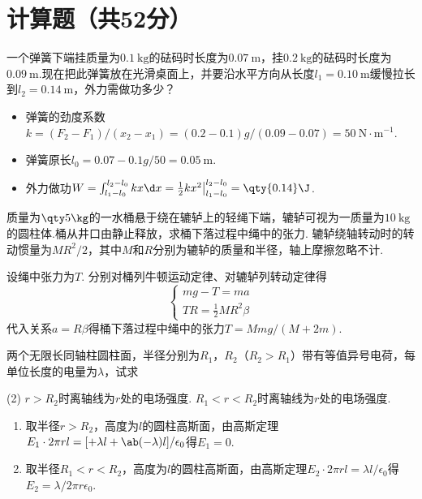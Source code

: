 \clearpage

\section{计算题（共52分）}

\begin{problem}
    一个弹簧下端挂质量为$\qty{0.1}\kg$的砝码时长度为$\qty{0.07}\m$，挂$\qty{0.2}\kg$的砝码时长度为$\qty{0.09}\m$.现在把此弹簧放在光滑桌面上，并要沿水平方向从长度$l_1=\qty{0.10}\m$缓慢拉长到$l_2=\qty{0.14}\m$，外力需做功多少？
\end{problem}
\begin{solution}\leavevmode
    \begin{itemize}
        \item 弹簧的劲度系数$k=(F_2-F_1)/(x_2-x_1)=(0.2-0.1)g/(0.09-0.07)=\qty{50}{\N\cdot\m^{-1}}$.
        \item 弹簧原长$l_0=0.07-0.1g/50=\qty{0.05}\m$.
        \item 外力做功$W=\int_{l_1-l_0}^{l_2-l_0}{kx\d x}=\frac{1}{2}kx^2\big|_{l_1-l_0}^{l_2-l_0}=\qty{0.14}\J$.
    \end{itemize}
\end{solution}

\begin{problem}
    质量为$\qty5\kg$的一水桶悬于绕在辘轳上的轻绳下端，辘轳可视为一质量为$\qty{10}\kg$的圆柱体.桶从井口由静止释放，求桶下落过程中绳中的张力. 辘轳绕轴转动时的转动惯量为$MR^2/2$，其中$M$和$R$分别为辘轳的质量和半径，轴上摩擦忽略不计.
\end{problem}
\begin{solution}
    设绳中张力为$T$. 分别对桶列牛顿运动定律、对辘轳列转动定律得
    \[\begin{cases}
        mg-T=ma\\
        TR=\frac{1}{2}MR^2\beta
    \end{cases}\]
    代入关系$a=R\beta$得桶下落过程中绳中的张力$T=Mmg/(M+2m)$.
\end{solution}

\begin{problem}
    两个无限长同轴柱圆柱面，半径分别为$R_1$，$R_2$（$R_2>R_1$）带有等值异号电荷，每单位长度的电量为$\lambda$，试求
    \begin{tasks}[label=\arabic*.](2)
        \task $r>R_2$时离轴线为$r$处的电场强度.
        \task $R_1<r<R_2$时离轴线为$r$处的电场强度.
    \end{tasks}
\end{problem}
\begin{solution}\leavevmode
    \begin{enumerate}
        \item 取半径$r>R_2$，高度为$l$的圆柱高斯面，由高斯定理$E_1\cdot 2\pi rl=[+\lambda l+\ab(-\lambda)l]/\epsilon_0$得$E_1=0$.
        \item 取半径$R_1<r<R_2$，高度为$l$的圆柱高斯面，由高斯定理$E_2\cdot 2\pi rl=\lambda l/\epsilon_0$得$E_2=\lambda/2\pi r\epsilon_0$.
    \end{enumerate}
\end{solution}

